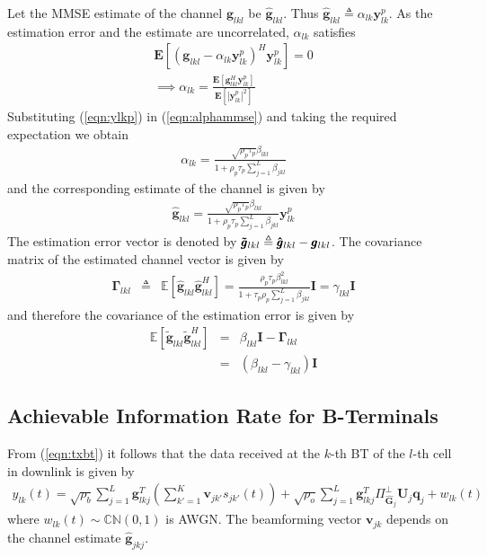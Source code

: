 \documentclass[10pt, a4paper, twoside,fleqn]{article}
\begin{document}
Let the MMSE estimate of the channel $\pmb{g}_{lkl}$ be $\pmb{\hat g}_{lkl}$. Thus $\pmb{\hat g}_{lkl} \triangleq \alpha_{lk}\pmb{y}_{lk}^{p}$. As the estimation error and the estimate are uncorrelated, $\alpha_{lk}$ satisfies
\begin{eqnarray}\label{eqn:alphammse}
	\pmb{E}[(\pmb{g}_{lkl}-\alpha_{lk}\pmb{y}_{lk}^{p})^H \pmb{y}_{lk}^{p}] = 0 \nonumber \\
	\implies \alpha_{lk} = \frac{\pmb{E}[\pmb{g}^{H}_{lkl} \pmb{y}_{lk}^{p}]}{\pmb{E}[|\pmb{y}_{lk}^{p}|^2]}
\end{eqnarray}
Substituting (\ref{eqn:ylkp}) in (\ref{eqn:alphammse}) and taking the required expectation we obtain
\begin{eqnarray}\label{eq:alphapll}
	\alpha_{lk}=\frac{\sqrt{\rho_p \tau_p} \beta_{lkl}}{1+\rho_p\tau_p\sum\limits_{j=1}^{L}\beta_{jkl}}
\end{eqnarray}
and the corresponding estimate of the channel is given by
\begin{eqnarray}\label{eq:estimatehpll}
	\pmb{\hat g}_{lkl} = \frac{\sqrt{\rho_p\tau_p}\beta_{lkl}}{1+\rho_p\tau_p\sum\limits_{j=1}^{L}\beta_{jkl}} \pmb{y}_{lk}^{p}
\end{eqnarray}
The estimation error vector is denoted by ${\pmb{\Tilde g}_{lkl}}  \triangleq  \pmb{{\hat g}}_{lkl} - \pmb{g}_{lkl}$.
The covariance matrix of the estimated channel vector is given by
\begin{eqnarray}
	\pmb{\Gamma}_{lkl} &\triangleq & \mathbb{E}[\pmb{\hat g}_{lkl}\pmb{\hat g}^H_{lkl}]
                    =       \frac{\rho_p\tau_p\beta^2_{lkl}}{1+\tau_p\rho_p\sum\limits_{j=1}^{L}\beta_{jkl}}\pmb{I} = \gamma_{lkl}\pmb{I}
\end{eqnarray}
and therefore the covariance of the estimation error is given by
\begin{eqnarray}
    \mathbb{E}[\pmb{\widetilde{g}}_{lkl} \pmb{\widetilde{g}}^H_{lkl}] &=& \beta_{lkl}\pmb{I}-\pmb{\Gamma}_{lkl} \nonumber \\
          									    &=& (\beta_{lkl} - \gamma_{lkl})\pmb{I}
\end{eqnarray}

\subsection{Achievable Information Rate for B-Terminals}
From (\ref{eqn:txbt}) it follows that the data received at the $k$-th BT of the $l$-th cell in downlink is given by
\begin{eqnarray}\label{eq:ot}
 	y_{lk}(t) = \sqrt{\rho_b}\sum_{j=1}^{L} \pmb{g}_{lkj}^{T} \left(\sum_{k'=1}^{K}\pmb{v}_{jk'}s_{jk'}(t)\right)
 		      + \sqrt{\rho_o}\sum_{j=1}^{L}\pmb{g}^T_{lkj} \Pi^{\perp}_{{\pmb{\widehat{G}}_j}} \pmb{U}_j\pmb{q}_{j}+ w_{lk}(t)
\end{eqnarray} 
where $w_{lk}(t) \sim {\mathbb C}{\mathbb N}(0,1)$  is AWGN. The beamforming vector $\pmb{v}_{jk}$ depends on the channel estimate $\pmb{\hat g}_{jkj}$.
\end{document}

